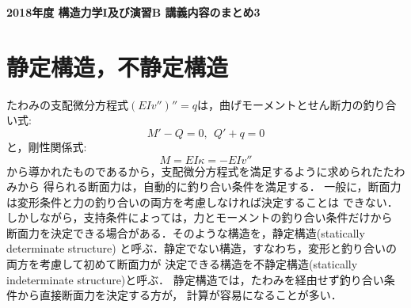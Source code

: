 \documentclass[10pt,a4j]{jarticle}
\newlength{\minitwocolumn}
\begin{document}
\newcommand{\fat}[1]{\mbox{\boldmath $#1$}}
\newcommand{\D}{\partial}
\newcommand{\w}{\omega}
\newcommand{\ga}{\alpha}
\newcommand{\gb}{\beta}
\newcommand{\gx}{\xi}
\newcommand{\gz}{\zeta}
\newcommand{\vhat}[1]{\hat{\fat{#1}}}
\newcommand{\spc}{\vspace{0.7\baselineskip}}
\newcommand{\halfspc}{\vspace{0.3\baselineskip}}

\newcommand{\twofig}[2]
 {
   \begin{figure}
     \begin{minipage}[t]{\minitwocolumn}
         \begin{center}   #1
         \end{center}
     \end{minipage}
         \hspace{\columnsep}
     \begin{minipage}[t]{\minitwocolumn}
         \begin{center} #2
         \end{center}
     \end{minipage}
   \end{figure}
 }
\begin{center}
	{\Large \bf 2018年度 構造力学I及び演習B 講義内容のまとめ3} \\
\end{center}
\section{静定構造，不静定構造}
たわみの支配微分方程式$(EIv'')''=q$は，曲げモーメントとせん断力の釣り合い式:
\begin{equation}
	M'-Q=0, \ \ Q'+q=0 
	\label{eqn:equiv_MQ}
\end{equation}
と，剛性関係式:
\begin{equation}
	M=EI\kappa = -EIv''
	\label{eqn:M_kpp}
\end{equation}
から導かれたものであるから，支配微分方程式を満足するように求められたたわみから
得られる断面力は，自動的に釣り合い条件を満足する．
一般に，断面力は変形条件と力の釣り合いの両方を考慮しなければ決定することは
できない．しかしながら，支持条件によっては，力とモーメントの釣り合い条件だけから
断面力を決定できる場合がある．そのような構造を，静定構造(statically determinate structure)
と呼ぶ．静定でない構造，すなわち，変形と釣り合いの両方を考慮して初めて断面力が
決定できる構造を不静定構造(statically indeterminate structure)と呼ぶ．
静定構造では，たわみを経由せず釣り合い条件から直接断面力を決定する方が，
計算が容易になることが多い．
\end{document}
